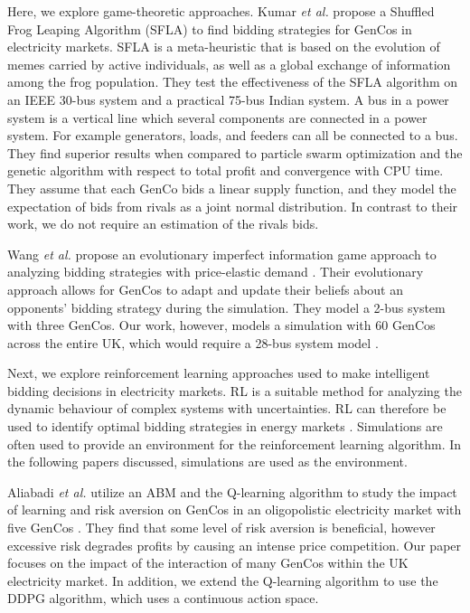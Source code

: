 Here, we explore game-theoretic approaches. Kumar \textit{et al.} propose a Shuffled Frog Leaping Algorithm (SFLA) \cite{VijayaKumar2014} to find bidding strategies for GenCos in electricity markets. SFLA is a meta-heuristic that is based on the evolution of memes carried by active individuals, as well as a global exchange of information among the frog population. They test the effectiveness of the SFLA algorithm on an IEEE 30-bus system and a practical 75-bus Indian system. A bus in a power system is a vertical line which several components are connected in a power system. For example generators, loads, and feeders can all be connected to a bus. They find superior results when compared to particle swarm optimization and the genetic algorithm with respect to total profit and convergence with CPU time. They assume that each GenCo bids a linear supply function, and they model the expectation of bids from rivals as a joint normal distribution. In contrast to their work, we do not require an estimation of the rivals bids.

Wang \textit{et al.} propose an evolutionary imperfect information game approach to analyzing bidding strategies with price-elastic demand \cite{Wang2011}. Their evolutionary approach allows for GenCos to adapt and update their beliefs about an opponents' bidding strategy during the simulation. They model a 2-bus system with three GenCos. Our work, however, models a simulation with 60 GenCos across the entire UK, which would require a 28-bus system model \cite{Bell2010}. 

Next, we explore reinforcement learning approaches used to make intelligent bidding decisions in electricity markets. RL is a suitable method for analyzing the dynamic behaviour of complex systems with uncertainties. RL can therefore be used to identify optimal bidding strategies in energy markets \cite{Yang2020}. Simulations are often used to provide an environment for the reinforcement learning algorithm. In the following papers discussed, simulations are used as the environment.


Aliabadi \textit{et al.} utilize an ABM and the Q-learning algorithm to study the impact of learning and risk aversion on GenCos in an oligopolistic electricity market with five GenCos \cite{EsmaeiliAliabadi2017}. They find that some level of risk aversion is beneficial, however excessive risk degrades profits by causing an intense price competition. Our paper focuses on the impact of the interaction of many GenCos within the UK electricity market. In addition, we extend the Q-learning algorithm to use the DDPG algorithm, which uses a continuous action space.

